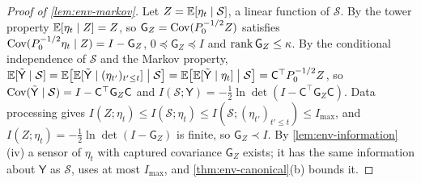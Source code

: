 \begin{proof}[Proof of \cref{lem:env-markov}]
Let $Z=\mathbb{E}[\eta_t\mid\mathcal S]$, a linear function of $\mathcal S$. By the tower property $\mathbb{E}[\eta_t\mid Z]=Z$, so $\mathsf G_Z=\operatorname{Cov}(P_0^{-1/2}Z)$ satisfies $\operatorname{Cov}(P_0^{-1/2}\eta_t\mid Z)=I-\mathsf G_Z$, $0\preceq\mathsf G_Z\preceq I$ and $\operatorname{rank}\mathsf G_Z\le\kappa$. By the conditional independence of $\mathcal S$ and the Markov property, $\mathbb{E}[\tilde{\mathsf Y}\mid\mathcal S]=\mathbb{E}\bigl[\mathbb{E}[\tilde{\mathsf Y}\mid(\eta_{t'})_{t'\le t}]\bigm|\mathcal S\bigr]=\mathbb{E}\bigl[\mathbb{E}[\tilde{\mathsf Y}\mid\eta_t]\bigm|\mathcal S\bigr]=\mathsf C^\top P_0^{-1/2}Z$, so $\operatorname{Cov}(\tilde{\mathsf Y}\mid\mathcal S)=I-\mathsf C^\top\mathsf G_Z\mathsf C$ and $I(\mathcal S;\mathsf Y)=-\frac12\ln\det(I-\mathsf C^\top\mathsf G_Z\mathsf C)$. Data processing gives $I(Z;\eta_t)\le I(\mathcal S;\eta_t)\le I(\mathcal S;(\eta_{t'})_{t'\le t})\le I_{\max}$, and $I(Z;\eta_t)=-\frac12\ln\det(I-\mathsf G_Z)$ is finite, so $\mathsf G_Z\prec I$. By \cref{lem:env-information}(iv) a sensor of $\eta_t$ with captured covariance $\mathsf G_Z$ exists; it has the same information about $\mathsf Y$ as $\mathcal S$, uses at most $I_{\max}$, and \cref{thm:env-canonical}(b) bounds it.
\end{proof}

